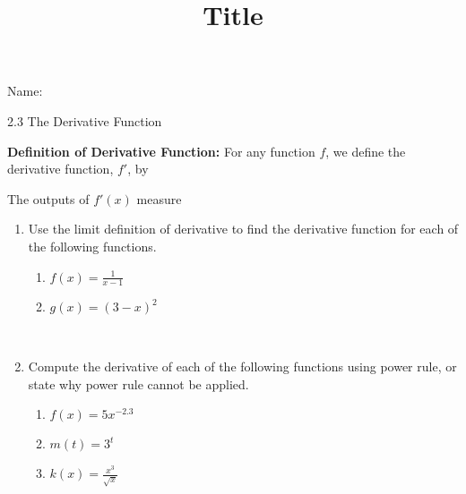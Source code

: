 \documentclass[12pt]{article}
\title{Title}
\begin{document}

 Name:
 \begin{center}\large{2.3 The Derivative Function}\end{center}
 
\begin{tcolorbox}

\textbf{Definition of Derivative Function:} For any function $f$, we define the derivative function, $f'$, by 
\vspace{10mm}


 \vspace{5mm}
 The outputs of $f'(x)$ measure \underline{\hspace{10cm}}
\end{tcolorbox}

\begin{enumerate}
\item Use the limit definition of derivative to find the derivative function for each of the following functions.
	\begin{enumerate}
	\item $\displaystyle f(x)=\frac{1}{x-1}$
	\vfill
	\item $\displaystyle g(x)=(3-x)^2$
	\vfill

	\end{enumerate}

\newpage

\hspace{10px}\\

\item Compute the derivative of each of the following functions using power rule, or state why power rule cannot be applied. 
	\begin{enumerate}
	\item $f(x)=5x^{-2.3}$
	\vfill
	\item $m(t)=3^t$
	\vfill
	\item $\displaystyle k(x)=\frac{x^3}{\sqrt{x}}$
	\vfill
	\end{enumerate}

\end{enumerate}
\end{document}
